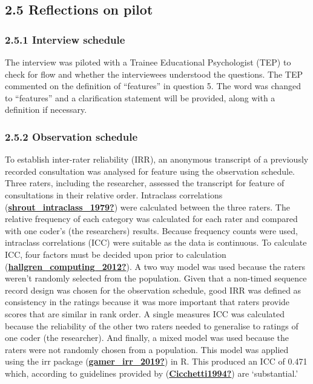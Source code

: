 \documentclass[
]{article}
\begin{document}
\hypertarget{reflections-on-pilot}{%
\subsection{2.5 Reflections on pilot}\label{reflections-on-pilot}}

\hypertarget{interview-schedule}{%
\subsubsection{2.5.1 Interview schedule}\label{interview-schedule}}

The interview was piloted with a Trainee Educational Psychologist (TEP)
to check for flow and whether the interviewees understood the questions.
The TEP commented on the definition of ``features'' in question 5. The
word was changed to ``features'' and a clarification statement will be
provided, along with a definition if necessary.

\hypertarget{observation-schedule}{%
\subsubsection{2.5.2 Observation schedule}\label{observation-schedule}}

To establish inter-rater reliability (IRR), an anonymous transcript of a
previously recorded consultation was analysed for feature using the
observation schedule. Three raters, including the researcher, assessed
the transcript for feature of consultations in their relative order.
Intraclass correlations
(\protect\hyperlink{ref-shrout_intraclass_1979}{\textbf{shrout\_intraclass\_1979?}})
were calculated between the three raters. The relative frequency of each
category was calculated for each rater and compared with one coder's
(the researchers) results. Because frequency counts were used,
intraclass correlations (ICC) were suitable as the data is continuous.
To calculate ICC, four factors must be decided upon prior to calculation
(\protect\hyperlink{ref-hallgren_computing_2012}{\textbf{hallgren\_computing\_2012?}}).
A two way model was used because the raters weren't randomly selected
from the population. Given that a non-timed sequence record design was
chosen for the observation schedule, good IRR was defined as consistency
in the ratings because it was more important that raters provide scores
that are similar in rank order. A single measures ICC was calculated
because the reliability of the other two raters needed to generalise to
ratings of one coder (the researcher). And finally, a mixed model was
used because the raters were not randomly chosen from a population. This
model was applied using the irr package
(\protect\hyperlink{ref-gamer_irr_2019}{\textbf{gamer\_irr\_2019?}}) in
R. This produced an ICC of 0.471 which, according to guidelines provided
by (\protect\hyperlink{ref-Cicchetti1994}{\textbf{Cicchetti1994?}}) are
`substantial.'
\end{document}
